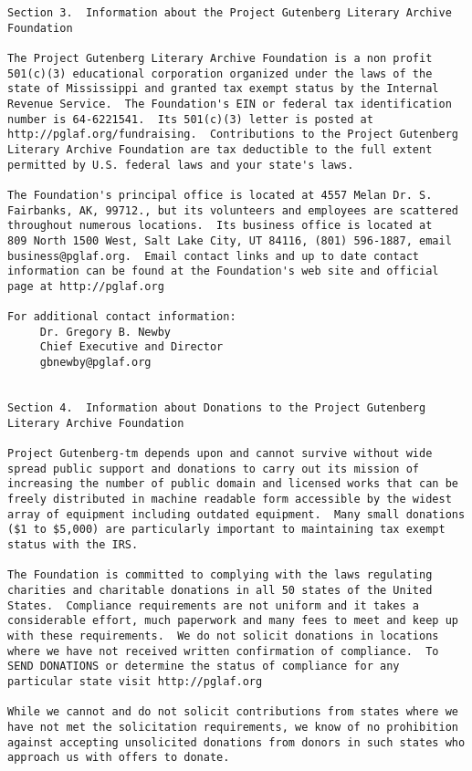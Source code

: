 \documentclass[12pt,oneside]{book}
\begin{document}
\begin{verbatim}
Section 3.  Information about the Project Gutenberg Literary Archive
Foundation

The Project Gutenberg Literary Archive Foundation is a non profit
501(c)(3) educational corporation organized under the laws of the
state of Mississippi and granted tax exempt status by the Internal
Revenue Service.  The Foundation's EIN or federal tax identification
number is 64-6221541.  Its 501(c)(3) letter is posted at
http://pglaf.org/fundraising.  Contributions to the Project Gutenberg
Literary Archive Foundation are tax deductible to the full extent
permitted by U.S. federal laws and your state's laws.

The Foundation's principal office is located at 4557 Melan Dr. S.
Fairbanks, AK, 99712., but its volunteers and employees are scattered
throughout numerous locations.  Its business office is located at
809 North 1500 West, Salt Lake City, UT 84116, (801) 596-1887, email
business@pglaf.org.  Email contact links and up to date contact
information can be found at the Foundation's web site and official
page at http://pglaf.org

For additional contact information:
     Dr. Gregory B. Newby
     Chief Executive and Director
     gbnewby@pglaf.org


Section 4.  Information about Donations to the Project Gutenberg
Literary Archive Foundation

Project Gutenberg-tm depends upon and cannot survive without wide
spread public support and donations to carry out its mission of
increasing the number of public domain and licensed works that can be
freely distributed in machine readable form accessible by the widest
array of equipment including outdated equipment.  Many small donations
($1 to $5,000) are particularly important to maintaining tax exempt
status with the IRS.

The Foundation is committed to complying with the laws regulating
charities and charitable donations in all 50 states of the United
States.  Compliance requirements are not uniform and it takes a
considerable effort, much paperwork and many fees to meet and keep up
with these requirements.  We do not solicit donations in locations
where we have not received written confirmation of compliance.  To
SEND DONATIONS or determine the status of compliance for any
particular state visit http://pglaf.org

While we cannot and do not solicit contributions from states where we
have not met the solicitation requirements, we know of no prohibition
against accepting unsolicited donations from donors in such states who
approach us with offers to donate.


\end{verbatim}
\end{document}
